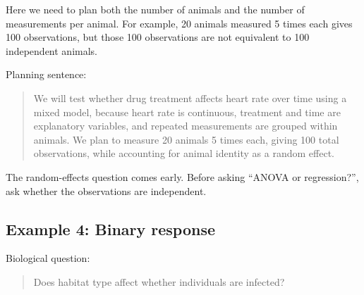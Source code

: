 \documentclass[
  letterpaper,
  8pt,
  a4paper]{book}
\begin{document}
Here we need to plan both the number of animals and the number of
measurements per animal. For example, 20 animals measured 5 times each
gives 100 observations, but those 100 observations are not equivalent to
100 independent animals.

Planning sentence:

\begin{quote}
We will test whether drug treatment affects heart rate over time using a
mixed model, because heart rate is continuous, treatment and time are
explanatory variables, and repeated measurements are grouped within
animals. We plan to measure 20 animals 5 times each, giving 100 total
observations, while accounting for animal identity as a random effect.
\end{quote}

\begin{tcolorbox}[enhanced jigsaw, arc=.35mm, bottomrule=.15mm, bottomtitle=1mm, breakable, colback=white, colbacktitle=quarto-callout-caution-color!10!white, colframe=quarto-callout-caution-color-frame, coltitle=black, left=2mm, leftrule=.75mm, opacityback=0, opacitybacktitle=0.6, rightrule=.15mm, title=\textcolor{quarto-callout-caution-color}{\faFire}\hspace{0.5em}{Caution}, titlerule=0mm, toprule=.15mm, toptitle=1mm]

The random-effects question comes early. Before asking ``ANOVA or
regression?'', ask whether the observations are independent.

\end{tcolorbox}

\subsection*{Example 4: Binary
response}\label{example-4-binary-response}

Biological question:

\begin{quote}
Does habitat type affect whether individuals are infected?
\end{quote}
\end{document}
